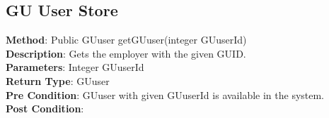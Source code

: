 \documentclass{l3deliverable}
\begin{document}




\subsection{GU User Store}

\textbf{Method}: Public GUuser getGUuser(integer GUuserId)\\
\textbf{Description}: Gets the employer with the given GUID.\\
\textbf{Parameters}: Integer GUuserId\\
\textbf{Return Type}: GUuser\\
\textbf{Pre Condition}: GUuser with given GUuserId is available in the system.\\
\textbf{Post Condition}:\\
\end{document}

